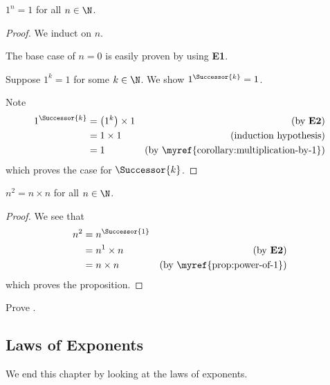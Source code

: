 \begin{proposition}
    $1^n = 1$ for all $n \in \N$.
\end{proposition}
\begin{proof}
    We induct on $n$.

    The base case of $n = 0$ is easily proven by using \textbf{E1}.

    Suppose $1^k = 1$ for some $k \in \N$. We show $1^\Successor{k} = 1$.

    Note
    \begin{align*}
        1^\Successor{k} &= \left(1^k\right) \times 1 & (\text{by \textbf{E2}})\\
        &= 1 \times 1 & (\text{induction hypothesis})\\
        &= 1 & (\text{by \myref{corollary:multiplication-by-1}})
    \end{align*}
    which proves the case for $\Successor{k}$.
\end{proof}

\begin{proposition}[Square]
    $n^2 = n \times n$ for all $n \in \N$.
\end{proposition}
\begin{proof}
    We see that
    \begin{align*}
        n^2 &= n^\Successor{1}\\
        &= n^1 \times n & (\text{by \textbf{E2}})\\
        &= n \times n & (\text{by \myref{prop:power-of-1}})
    \end{align*}
    which proves the proposition.
\end{proof}

\begin{exercise}\label{exercise:power-of-1}
    Prove .
\end{exercise}

\subsection{Laws of Exponents}
We end this chapter by looking at the laws of exponents.

